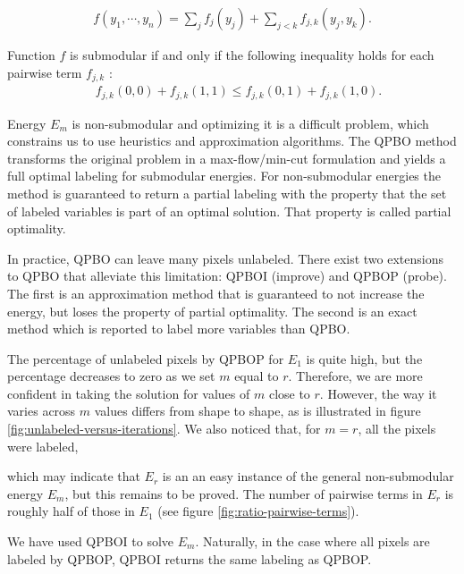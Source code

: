 \documentclass[smallextended]{svjour3}       %
\begin{document}
{\begin{align*}
f(y_1,\cdots, y_n) = \sum_{j}{f_j(y_j)} + \sum_{j < k}{f_{j,k}(y_j,y_k)}.
\end{align*}

Function $f$ is submodular if and only if the following inequality holds for each pairwise term $f_{j,k}$ \cite{kolmogorov04whatenergies}:
\begin{align*}
  \quad f_{j,k}(0,0) + f_{j,k}(1,1) \leq f_{j,k}(0,1) + f_{j,k}(1,0).
\end{align*}

Energy $E_m$ is non-submodular and optimizing it is a difficult problem, which constrains us to use heuristics and
approximation algorithms. The QPBO method \cite{rother07qpbo} transforms the original problem in a max-flow/min-cut
formulation and yields a full optimal labeling for submodular energies. For non-submodular energies the method is
guaranteed to return a partial labeling with the property that the set of labeled variables is part of an optimal
solution. That property is called partial optimality.

In practice, QPBO can leave many pixels unlabeled. There exist two extensions to QPBO that alleviate this limitation:
QPBOI (improve) and QPBOP (probe). The first is an approximation method that is guaranteed to not increase the energy,
but loses the property of partial optimality. The second is an exact method which is reported to label more variables
than QPBO.

The percentage of unlabeled pixels by QPBOP for $E_1$ is quite high, but the percentage decreases to zero as we set $m$
equal to $r$. Therefore, we are more confident in taking the solution for values of $m$ close to $r$. However, the way it
varies across $m$ values differs from shape to shape, as is illustrated in figure
\ref{fig:unlabeled-versus-iterations}. We also noticed that, for $m=r$, all the pixels were labeled, {which may
  indicate that $E_r$ is an an easy instance of the general non-submodular energy $E_m$, but this remains to be
  proved. The number of pairwise terms in $E_r$ is roughly half of those in $E_1$ (see figure
  \ref{fig:ratio-pairwise-terms}).

  We have used QPBOI to solve $E_m$. Naturally, in the case where all pixels are labeled by QPBOP, QPBOI returns the
  same labeling as QPBOP.


}}
\end{document}
